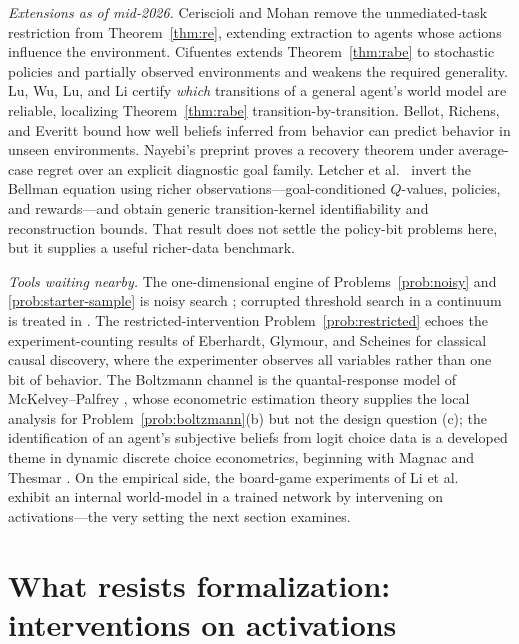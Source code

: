 \documentclass[11pt]{amsart}
\theoremstyle{plain}
\theoremstyle{definition}
\begin{document}
\emph{Extensions as of mid-2026.} Ceriscioli and Mohan \cite{ceriscioli2025} remove the unmediated-task restriction from Theorem~\ref{thm:re}, extending extraction to agents whose actions influence the environment. Cifuentes \cite{cifuentes2026} extends Theorem~\ref{thm:rabe} to stochastic policies and partially observed environments and weakens the required generality. Lu, Wu, Lu, and Li \cite{lu2026} certify \emph{which} transitions of a general agent's world model are reliable, localizing Theorem~\ref{thm:rabe} transition-by-transition. Bellot, Richens, and Everitt \cite{bellot2025} bound how well beliefs inferred from behavior can predict behavior in unseen environments. Nayebi's preprint \cite{nayebi2026} proves a recovery theorem under average-case regret over an explicit diagnostic goal family. Letcher et al.\ \cite{letcher2026} invert the Bellman equation using richer observations---goal-conditioned $Q$-values, policies, and rewards---and obtain generic transition-kernel identifiability and reconstruction bounds. That result does not settle the policy-bit problems here, but it supplies a useful richer-data benchmark.

\emph{Tools waiting nearby.} The one-dimensional engine of Problems~\ref{prob:noisy} and \ref{prob:starter-sample} is noisy search \cite{rivest1980,feige1994,benor2008,karp2007}; corrupted threshold search in a continuum is treated in \cite{krishnamurthy2021}. The restricted-intervention Problem~\ref{prob:restricted} echoes the experiment-counting results of Eberhardt, Glymour, and Scheines \cite{eberhardt2005} for classical causal discovery, where the experimenter observes all variables rather than one bit of behavior. The Boltzmann channel is the quantal-response model of McKelvey--Palfrey \cite{mckelvey1995}, whose econometric estimation theory supplies the local analysis for Problem~\ref{prob:boltzmann}(b) but not the design question (c); the identification of an agent's subjective beliefs from logit choice data is a developed theme in dynamic discrete choice econometrics, beginning with Magnac and Thesmar \cite{magnac2002}. On the empirical side, the board-game experiments of Li et al.\ \cite{li2023} exhibit an internal world-model in a trained network by intervening on activations---the very setting the next section examines.

\section{What resists formalization: interventions on activations}\label{sec:obstruction}
\end{document}
